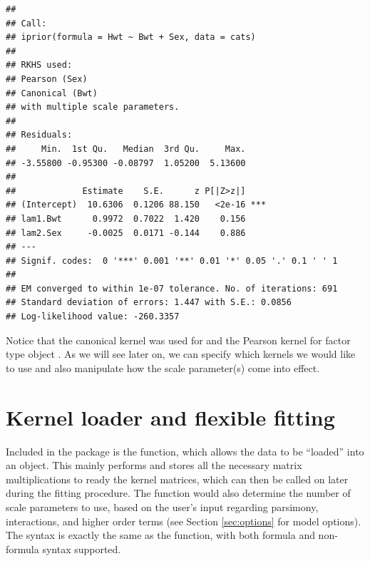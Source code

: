 \begin{knitrout}
\color{fgcolor}\begin{kframe}
\begin{alltt}
\end{alltt}
\begin{verbatim}
## 
## Call:
## iprior(formula = Hwt ~ Bwt + Sex, data = cats)
## 
## RKHS used:
## Pearson (Sex) 
## Canonical (Bwt) 
## with multiple scale parameters.
## 
## Residuals:
##     Min.  1st Qu.   Median  3rd Qu.     Max. 
## -3.55800 -0.95300 -0.08797  1.05200  5.13600 
## 
##             Estimate    S.E.      z P[|Z>z|]    
## (Intercept)  10.6306  0.1206 88.150   <2e-16 ***
## lam1.Bwt      0.9972  0.7022  1.420    0.156    
## lam2.Sex     -0.0025  0.0171 -0.144    0.886    
## ---
## Signif. codes:  0 '***' 0.001 '**' 0.01 '*' 0.05 '.' 0.1 ' ' 1
## 
## EM converged to within 1e-07 tolerance. No. of iterations: 691
## Standard deviation of errors: 1.447 with S.E.: 0.0856
## Log-likelihood value: -260.3357
\end{verbatim}
\end{kframe}
\end{knitrout}

Notice that the canonical kernel was used for  and the Pearson kernel for factor type object . As we will see later on, we can specify which kernels we would like to use and also manipulate how the scale parameter(s) come into effect.

\section{Kernel loader and flexible fitting}

Included in the  package is the  function, which allows the data to be ``loaded'' into an  object. This mainly performs and stores all the necessary matrix multiplications to ready the kernel matrices, which can then be called on later during the fitting procedure. The  function would also determine the number of scale parameters to use, based on the user's input regarding parsimony, interactions, and higher order terms (see Section \ref{sec:options} for model options). The syntax is exactly the same as the  function, with both formula and non-formula syntax supported.

\begin{knitrout}
\color{fgcolor}\begin{kframe}
\begin{alltt}
 \hlkwb{<-}  \hlopt{~}  \hlopt{+}     
 \hlkwb{<-} \hlstd{(} \hlopt{$}\hlopt{$}\hlopt{$}  
\end{alltt}
\end{kframe}
\end{knitrout}


